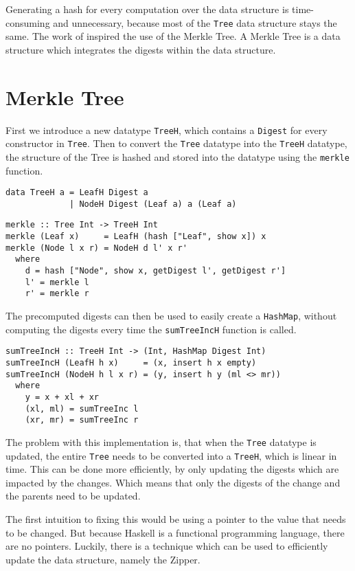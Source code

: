 Generating a hash for every computation over the data structure is time-consuming and unnecessary, because most of the \texttt{Tree} data structure stays the same. The work of \citeauthor{miraldo2019efficient}\cite{miraldo2019efficient} inspired the use of the Merkle Tree. A Merkle Tree is a data structure which integrates the digests within the data structure.

\section{Merkle Tree}
First we introduce a new datatype \texttt{TreeH}, which contains a \texttt{Digest} for every constructor in \texttt{Tree}. Then to convert the \texttt{Tree} datatype into the \texttt{TreeH} datatype, the structure of the Tree is hashed and stored into the datatype using the \texttt{merkle} function.

\begin{verbatim}
data TreeH a = LeafH Digest a
             | NodeH Digest (Leaf a) a (Leaf a)
\end{verbatim}

\begin{verbatim}
merkle :: Tree Int -> TreeH Int
merkle (Leaf x)     = LeafH (hash ["Leaf", show x]) x
merkle (Node l x r) = NodeH d l' x r'
  where
    d = hash ["Node", show x, getDigest l', getDigest r']
    l' = merkle l
    r' = merkle r
\end{verbatim}

The precomputed digests can then be used to easily create a \texttt{HashMap}, without computing the digests every time the \texttt{sumTreeIncH} function is called.

\begin{verbatim}
sumTreeIncH :: TreeH Int -> (Int, HashMap Digest Int)
sumTreeIncH (LeafH h x)     = (x, insert h x empty)
sumTreeIncH (NodeH h l x r) = (y, insert h y (ml <> mr))
  where
    y = x + xl + xr
    (xl, ml) = sumTreeInc l
    (xr, mr) = sumTreeInc r
\end{verbatim}

The problem with this implementation is, that when the \texttt{Tree} datatype is updated, the entire \texttt{Tree} needs to be converted into a \texttt{TreeH}, which is linear in time. This can be done more efficiently, by only updating the digests which are impacted by the changes. Which means that only the digests of the change and the parents need to be updated. 

The first intuition to fixing this would be using a pointer to the value that needs to be changed. But because Haskell is a functional programming language, there are no pointers. Luckily, there is a technique which can be used to efficiently update the data structure, namely the Zipper\cite{huet1997zipper}.

